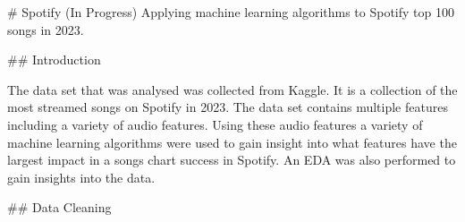 # Spotify (In Progress)
Applying machine learning algorithms to Spotify top 100 songs in 2023. 


## Introduction 

The data set that was analysed was collected from Kaggle. It is a collection of the most streamed songs on Spotify in 2023. The data set contains multiple features including a variety of audio features. Using these audio features a variety of machine learning algorithms were used to gain insight into what features have the largest impact in a songs chart success in Spotify. An EDA was also performed to gain insights into the data.  

## Data Cleaning 
